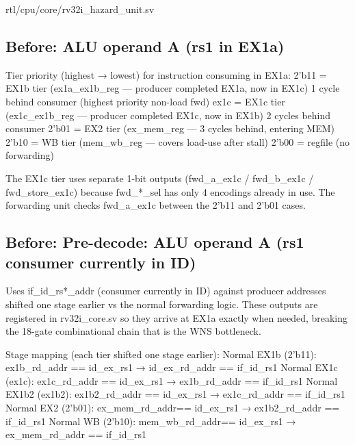 \begin{relocated}{rtl/cpu/core/rv32i_hazard_unit.sv}

\subsection*{Before: ALU operand A (rs1 in EX1a)}

\begin{textblock}
Tier priority (highest → lowest) for instruction consuming in EX1a:
  2'b11 = EX1b tier (ex1a_ex1b_reg — producer completed EX1a, now in EX1c)
          1 cycle behind consumer (highest priority non-load fwd)
  ex1c  = EX1c tier (ex1c_ex1b_reg — producer completed EX1c, now in EX1b)
          2 cycles behind consumer
  2'b01 = EX2  tier (ex_mem_reg — 3 cycles behind, entering MEM)
  2'b10 = WB   tier (mem_wb_reg — covers load-use after stall)
  2'b00 = regfile (no forwarding)

The EX1c tier uses separate 1-bit outputs (fwd_a_ex1c / fwd_b_ex1c /
fwd_store_ex1c) because fwd_*_sel has only 4 encodings already in use.
The forwarding unit checks fwd_a_ex1c between the 2'b11 and 2'b01 cases.
\end{textblock}

\subsection*{Before: Pre-decode: ALU operand A (rs1 consumer currently in ID)}

\begin{textblock}
Uses if_id_rs*_addr (consumer currently in ID) against producer addresses
shifted one stage earlier vs the normal forwarding logic.  These outputs
are registered in rv32i_core.sv so they arrive at EX1a exactly when needed,
breaking the 18-gate combinational chain that is the WNS bottleneck.

Stage mapping (each tier shifted one stage earlier):
  Normal EX1b  (2'b11):  ex1b_rd_addr  == id_ex_rs1   →  id_ex_rd_addr  == if_id_rs1
  Normal EX1c  (ex1c):   ex1c_rd_addr  == id_ex_rs1   →  ex1b_rd_addr   == if_id_rs1
  Normal EX1b2 (ex1b2):  ex1b2_rd_addr == id_ex_rs1   →  ex1c_rd_addr   == if_id_rs1
  Normal EX2   (2'b01):  ex_mem_rd_addr== id_ex_rs1   →  ex1b2_rd_addr  == if_id_rs1
  Normal WB    (2'b10):  mem_wb_rd_addr== id_ex_rs1   →  ex_mem_rd_addr == if_id_rs1
\end{textblock}

\end{relocated}

